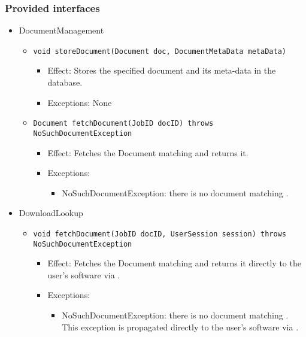 \subsubsection*{Provided interfaces}
\begin{itemize}
    \item DocumentManagement
	\begin{itemize}
		\item \texttt{void storeDocument(Document doc, DocumentMetaData metaData)}
		\begin{itemize}
			\item Effect: Stores the specified document and its meta-data in the database.
			\item Exceptions: None
		\end{itemize}
		
		\item \texttt{Document fetchDocument(JobID docID) throws NoSuchDocumentException}
		\begin{itemize}
			\item Effect: Fetches the Document matching  and returns it.
			\item Exceptions: 
			\begin{itemize}
				\item NoSuchDocumentException: there is no document matching .
			\end{itemize}
		\end{itemize}
	\end{itemize}

    \item DownloadLookup
	\begin{itemize}
		\item \texttt{void fetchDocument(JobID docID, UserSession session) throws NoSuchDocumentException}
		\begin{itemize}
			\item Effect: Fetches the Document matching  and returns it directly to the user's software via .
			\item Exceptions:
			\begin{itemize}
				\item NoSuchDocumentException: there is no document matching . This exception is propagated directly to the user's software via .
			\end{itemize}
		\end{itemize}
	\end{itemize}
\end{itemize}

